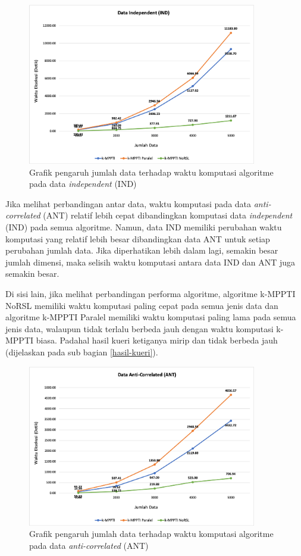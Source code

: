 \begin{figure}[H]
	\centering
	\includegraphics[width=10cm]{assets/img/bab5/grafik-ind-jml-time.png}
	\caption{Grafik pengaruh jumlah data terhadap waktu komputasi algoritme pada data \textit{independent} (IND)}
	\label{fig:grafik-ind-jml-time}
\end{figure}

Jika melihat perbandingan antar data, waktu komputasi pada data \textit{anti-correlated} (ANT) relatif lebih cepat dibandingkan komputasi data \textit{independent} (IND) pada semua algoritme. Namun, data IND memiliki perubahan waktu komputasi yang relatif lebih besar dibandingkan data ANT untuk setiap perubahan jumlah data. Jika diperhatikan lebih dalam lagi, semakin besar jumlah dimensi, maka selisih waktu komputasi antara data IND dan ANT juga semakin besar.

Di sisi lain, jika melihat perbandingan performa algoritme, algoritme k-MPPTI NoRSL memiliki waktu komputasi paling cepat pada semua jenis data dan algoritme k-MPPTI Paralel memiliki waktu komputasi paling lama pada semua jenis data, walaupun tidak terlalu berbeda jauh dengan waktu komputasi k-MPPTI biasa. Padahal hasil kueri ketiganya mirip dan tidak berbeda jauh (dijelaskan pada sub bagian \ref{hasil-kueri}).

\begin{figure}[H]
	\centering
	\includegraphics[width=10cm]{assets/img/bab5/grafik-ant-jml-time.png}
	\caption{Grafik pengaruh jumlah data terhadap waktu komputasi algoritme pada data \textit{anti-correlated} (ANT)}
	\label{fig:grafik-ant-jml-time}
\end{figure}

